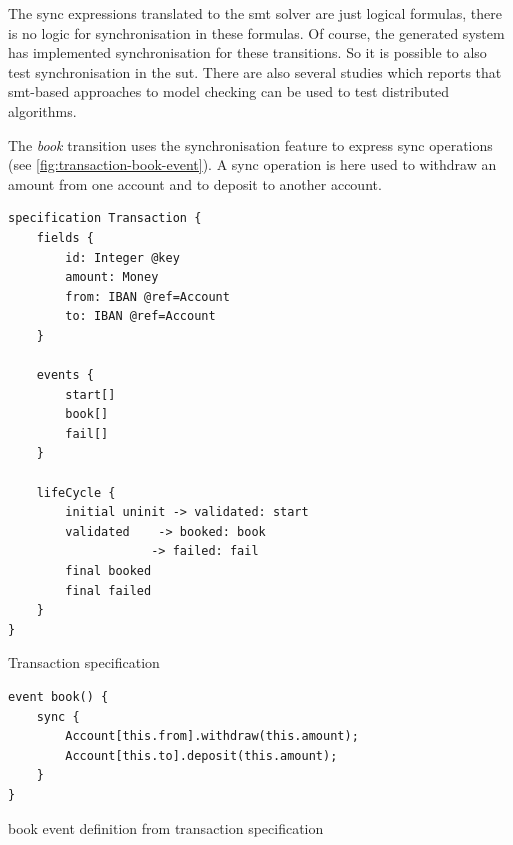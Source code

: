 The sync expressions translated to the \gls{smt} solver are just logical formulas,
there is no logic for synchronisation in these formulas. Of course, the generated system has
implemented synchronisation for these transitions. So it is possible to also
test synchronisation in the \gls{sut}. There are also several studies which reports
that \gls{smt}-based approaches to model checking can be used to test distributed
algorithms.~\cite{konnov2015you, alberti2015smt, mccaffrey2016verification}


The \textit{book} transition uses the synchronisation feature to express sync
operations (see \autoref{fig:transaction-book-event}). A sync operation is here
used to withdraw an amount from one account and to deposit to another account.


\begin{sourcecode}[h!]
\begin{lstlisting}[]
specification Transaction {
	fields {
		id: Integer @key
		amount: Money
		from: IBAN @ref=Account
		to: IBAN @ref=Account
	}

	events {
		start[]
		book[]
		fail[]
	}

	lifeCycle {
		initial uninit -> validated: start
		validated    -> booked: book
					-> failed: fail
		final booked
		final failed
	}
}
\end{lstlisting}
\caption{Transaction specification}\label{fig:transaction-spec}
\end{sourcecode}
\FloatBarrier

\begin{sourcecode}[h!]
\begin{lstlisting}[]
event book() {
	sync {
		Account[this.from].withdraw(this.amount);
		Account[this.to].deposit(this.amount);
	}
}
\end{lstlisting}
\caption{book event definition from transaction specification}\label{fig:transaction-book-event}
\end{sourcecode}
\FloatBarrier

